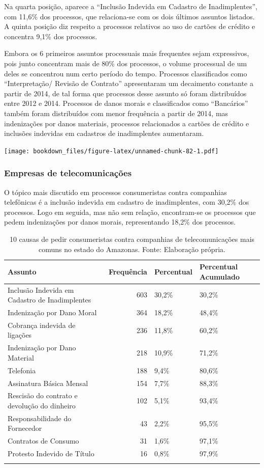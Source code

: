 \documentclass[]{report}
\begin{document}
Na quarta posição, aparece a ``Inclusão Indevida em Cadastro de
Inadimplentes'', com 11,6\% dos processos, que relaciona-se com os dois
últimos assuntos listados. A quinta posição diz respeito a processos
relativos ao uso de cartões de crédito e concentra 9,1\% dos processos.

Embora os 6 primeiros assuntos processuais mais frequentes sejam
expressivos, pois junto concentram mais de 80\% dos processos, o volume
processual de um deles se concentrou num certo período do tempo.
Processos classificados como ``Interpretação/ Revisão de Contrato''
apresentaram um decaimento constante a partir de 2014, de tal forma que
processos desse assunto só foram distribuídos entre 2012 e 2014.
Processos de danos morais e classificados como ``Bancários'' também
foram distribuídos com menor frequência a partir de 2014, mas
indenizações por danos materiais, processos relacionados a cartões de
crédito e inclusões indevidas em cadastros de inadimplentes aumentaram.

\texttt{[image: bookdown\_files/figure-latex/unnamed-chunk-82-1.pdf]}

\subsubsection{Empresas de
telecomunicações}\label{empresas-de-telecomunicacoes-4}

O tópico mais discutido em processos consumeristas contra companhias
telefônicas é a inclusão indevida em cadastro de inadimplentes, com
30,2\% dos processos. Logo em seguida, mas não sem relação, encontram-se
os processos que pedem indenizações por danos morais, representando
18,2\% dos processos.

\begin{longtable}{lrll}
\caption{10 causas de pedir consumeristas contra companhias de telecomunicações mais comuns no estado do Amazonas. Fonte: Elaboração própria.} \\
  \hline
Assunto & Frequência & Percentual & Percentual Acumulado \\
  \hline
Inclusão Indevida em Cadastro de Inadimplentes & 603 & 30,2\% & 30,2\% \\
  Indenização por Dano Moral & 364 & 18,2\% & 48,4\% \\
  Cobrança indevida de ligações & 236 & 11,8\% & 60,2\% \\
  Indenização por Dano Material & 218 & 10,9\% & 71,2\% \\
  Telefonia & 188 & 9,4\% & 80,6\% \\
  Assinatura Básica Mensal & 154 & 7,7\% & 88,3\% \\
  Rescisão do contrato e devolução do dinheiro & 102 & 5,1\% & 93,4\% \\
  Responsabilidade do Fornecedor &  43 & 2,2\% & 95,5\% \\
  Contratos de Consumo &  31 & 1,6\% & 97,1\% \\
  Protesto Indevido de Título &  16 & 0,8\% & 97,9\% \\
   \hline
\hline
\label{unnamed-chunk-84}
\end{longtable}
\end{document}
